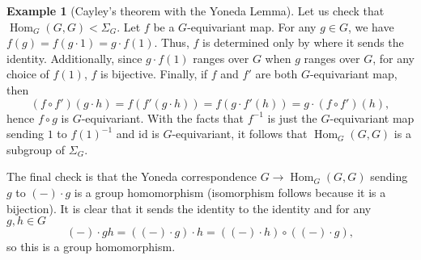 \documentclass{article}
\theoremstyle{definition}
\newtheorem{exmp}[thm]{Example}
\theoremstyle{remark}
\DeclareMathOperator{\Hom}{Hom}
\newcommand{\id}{\text{id}}
\begin{document}
\begin{exmp}[Cayley's theorem with the Yoneda Lemma]
	Let us check that $\Hom_G(G,G) < \Sigma_G$. Let $f$ be a $G$-equivariant map. For any $g\in G$, we have $f(g) = f(g\cdot 1) = g \cdot f(1)$. Thus, $f$ is determined only by where it sends the identity. Additionally, since $g \cdot f(1)$ ranges over $G$ when $g$ ranges over $G$, for any choice of $f(1)$, $f$ is bijective. Finally, if $f$ and $f'$ are both $G$-equivariant map, then $$(f\circ f')(g\cdot h) = f(f'(g\cdot h)) = f(g \cdot f'(h)) = g\cdot (f\circ f')(h),$$
	hence $f\circ g$ is $G$-equivariant. With the facts that $f^{-1}$ is just the $G$-equivariant map sending $1$ to $f(1)^{-1}$ and $\id$ is $G$-equivariant, it follows that $\Hom_G(G,G)$ is a subgroup of $\Sigma_G$.
	
	The final check is that the Yoneda correspondence $G\rightarrow \Hom_G(G,G)$ sending $g$ to $(-)\cdot g$ is a group homomorphism (isomorphism follows because it is a bijection). It is clear that it sends the identity to the identity and for any $g, h \in G$
	$$(-)\cdot gh = ((-) \cdot g)\cdot h = ((-)\cdot h) \circ ((-)\cdot g),$$ so this is a group homomorphism. 
\end{exmp}
\end{document}
